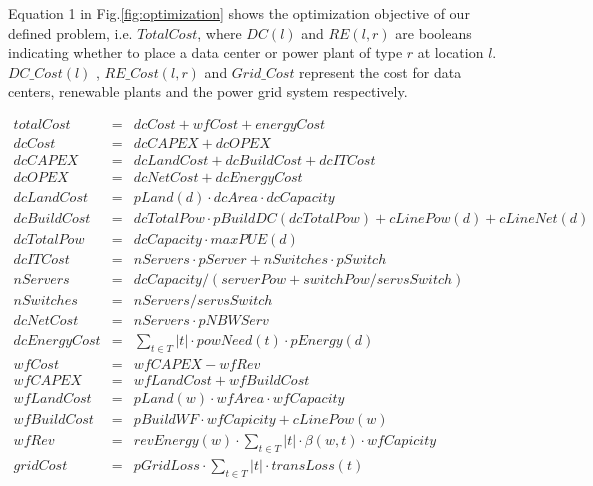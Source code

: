 Equation 1 in Fig.\ref{fig:optimization} shows the optimization objective of our defined problem, i.e. $TotalCost$, where $DC(l)$ and $RE(l,r)$ are booleans indicating whether to place a data center or power plant of type $r$ at location $l$. $DC\_Cost(l)$ , $RE\_Cost(l,r)$ and $Grid\_Cost$ represent the cost for data centers, renewable plants and the power grid system respectively.

\begin{figure*}
\begin{eqnarray}
	totalCost & = & dcCost + wfCost + energyCost \\
	dcCost & = & dcCAPEX + dcOPEX \\
        dcCAPEX & = & dcLandCost + dcBuildCost + dcITCost \\
        dcOPEX & = & dcNetCost + dcEnergyCost \\
        dcLandCost & = & pLand(d) \cdot dcArea \cdot dcCapacity \\
        dcBuildCost & = & dcTotalPow \cdot pBuildDC(dcTotalPow) +
            cLinePow(d) + cLineNet(d) \\
        dcTotalPow & = & dcCapacity \cdot maxPUE(d) \\
        dcITCost & = & nServers \cdot pServer + nSwitches \cdot
            pSwitch \\
        nServers & = & dcCapacity / (serverPow + switchPow / servsSwitch)\\
        nSwitches & = & nServers / servsSwitch\\
        dcNetCost & = & nServers \cdot pNBWServ \\
        dcEnergyCost & = & \sum_{t \in T} {|t| \cdot powNeed(t) \cdot pEnergy(d) } \\
 	wfCost & = & wfCAPEX - wfRev  \\
        wfCAPEX & = & wfLandCost + wfBuildCost \\
        wfLandCost & = & pLand(w) \cdot wfArea \cdot wfCapacity \\
        wfBuildCost & = & pBuildWF \cdot wfCapicity + cLinePow(w) \\
        wfRev & = & revEnergy(w) \cdot  \sum_{t \in T}{ |t| \cdot
            \beta(w,t) \cdot wfCapicity } \\
        gridCost & = & pGridLoss \cdot \sum_{t \in T}{ |t| \cdot transLoss(t)} \\%
\end{eqnarray}
\caption{Optimization framework.  The datacenter is placed at location $d$ and the windfarm is placed at location $w$.  The objective is to minimize $totalCost$ for a given time period $T$ (divided into epochs denoted by $t$) and a set of possible locations for $d$ and $w$.  $|t|$ denotes the length of epoch $t$.}
\label{fig:optimization}
\end{figure*}

